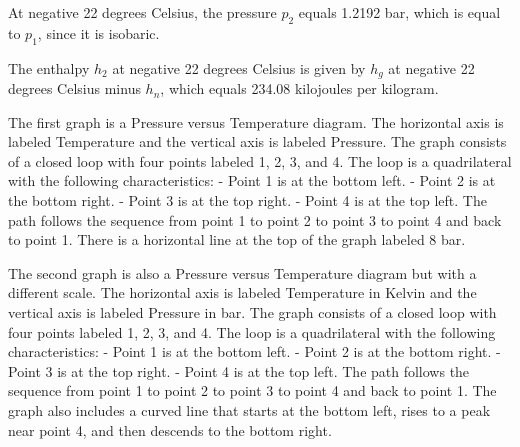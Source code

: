 At negative 22 degrees Celsius, the pressure \( p_2 \) equals 1.2192 bar, which is equal to \( p_1 \), since it is isobaric.

The enthalpy \( h_2 \) at negative 22 degrees Celsius is given by \( h_g \) at negative 22 degrees Celsius minus \( h_n \), which equals 234.08 kilojoules per kilogram.

The first graph is a Pressure versus Temperature diagram. The horizontal axis is labeled Temperature and the vertical axis is labeled Pressure. The graph consists of a closed loop with four points labeled 1, 2, 3, and 4. The loop is a quadrilateral with the following characteristics:
- Point 1 is at the bottom left.
- Point 2 is at the bottom right.
- Point 3 is at the top right.
- Point 4 is at the top left.
The path follows the sequence from point 1 to point 2 to point 3 to point 4 and back to point 1. There is a horizontal line at the top of the graph labeled 8 bar.

The second graph is also a Pressure versus Temperature diagram but with a different scale. The horizontal axis is labeled Temperature in Kelvin and the vertical axis is labeled Pressure in bar. The graph consists of a closed loop with four points labeled 1, 2, 3, and 4. The loop is a quadrilateral with the following characteristics:
- Point 1 is at the bottom left.
- Point 2 is at the bottom right.
- Point 3 is at the top right.
- Point 4 is at the top left.
The path follows the sequence from point 1 to point 2 to point 3 to point 4 and back to point 1. The graph also includes a curved line that starts at the bottom left, rises to a peak near point 4, and then descends to the bottom right.